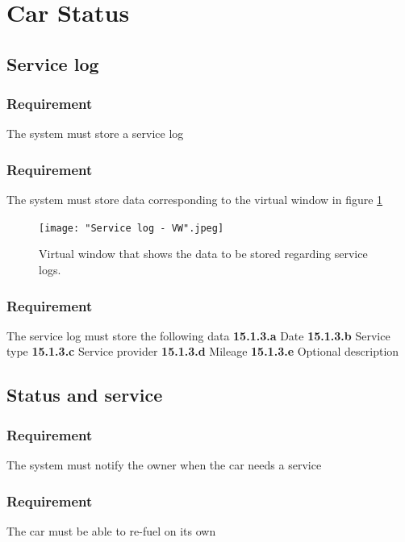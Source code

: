 \documentclass{article}
\begin{document}
{\section{Car Status}
  \subsection{Service log}
      \subsubsection{Requirement}
\hfill \break 
\- \- \-The system must store a service log
      \subsubsection{Requirement}
\hfill \break 
\- \- \- The system must store data corresponding to the virtual window in figure \ref{fig:Virtual window Service log}


\begin{figure}[htb]    
 \centering
  \texttt{[image: "Service log - VW".jpeg]}
  \caption{Virtual window that shows the data to be stored regarding service logs.}
  \label{fig:Virtual window Service log}
\end{figure}

      \subsubsection{Requirement}
\hfill \break 
\- \- \-The service log must store the following data
\hfill \break 
\indent
\textbf{15.1.3.a} Date
\hfill \break 
\indent
\textbf{15.1.3.b} Service type
\hfill \break 
\indent
\textbf{15.1.3.c} Service provider
\hfill \break 
\indent
\textbf{15.1.3.d} Mileage
\hfill \break 
\indent
\textbf{15.1.3.e} Optional description
  \subsection{Status and service}
      \subsubsection{Requirement}
\hfill \break 
\- \- \-The system must notify the owner when the car needs a service
      \subsubsection{Requirement}
\hfill \break 
\- \- \-The car must be able to re-fuel on its own
}
\end{document}

